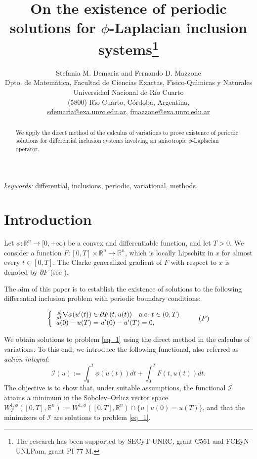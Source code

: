 \documentclass[twoside]{article}
\title{On the existence of periodic solutions for $\phi$-Laplacian inclusion systems\thanks{   The research has been supported by SECyT-UNRC, grant C561 and FCEyN-UNLPam, grant PI 77 M.
}}
\author{
Stefania M. Demaria and  Fernando D. Mazzone \\
Dpto. de Matem\'atica, Facultad de Ciencias Exactas, F\'{\i}sico-Qu\'{\i}micas y Naturales\\
Universidad Nacional de R\'{i}o Cuarto\\
(5800) R\'{\i}o Cuarto, C\'ordoba, Argentina,\\
\url{sdemaria@exa.unrc.edu.ar},
\url{fmazzone@exa.unrc.edu.ar} \\
}
\date{}
\theoremstyle{definition}
\theoremstyle{plain}
\theoremstyle{remark}
\begin{document}
\maketitle
\begin{abstract}
We apply the direct method of the calculus of variations to prove existence of periodic solutions for differential inclusion systems involving an anisotropic $\phi$-Laplacian operator.
 \end{abstract}

 \noindent\textit{keywords:} differential, inclusions, periodic, variational, methods.

\section{Introduction}

Let $\phi:\mathbb{R}^n \to [0,+\infty)$ be a convex and differentiable function, and let $T > 0$. We consider a function $F : [0,T] \times \mathbb{R}^n \to \mathbb{R}^n$, which is locally Lipschitz in $x$ for almost every $t \in [0,T]$. The Clarke generalized gradient of $F$ with respect to $x$ is denoted by $\partial F$ (see \cite{clarke1990optimization, clarke2013functional}).
 
 



The aim of this paper is to establish the existence of solutions to the following differential inclusion problem with periodic boundary conditions:

\begin{equation}\label{eq_1}\left\{
\begin{array}{ll}
   \frac{d}{dt} \nabla\phi(u'(t))\in \partial F(t,u(t)) \quad \hbox{a.e.}\ t \in (0,T)\\
    u(0)-u(T)=u'(0)-u'(T)=0,
\end{array}\right.\tag{$P$}
\end{equation}

We obtain solutions to problem \eqref{eq_1} using the direct method in the calculus of variations. To this end, we introduce the following functional, also referred as \emph{action integral}:
\begin{equation}\label{funcional}
    \mathcal{I}(u):=\int_{0}^{T}\phi(\dot u(t))dt+\int_{0}^{T}F(t, u(t))dt.\tag{I}
\end{equation}
The objective is to show that, under suitable assumptions, the functional $\mathcal{I}$ attains a minimum in the Sobolev–Orlicz vector space $W^{1,\phi}_T([0,T], \mathbb{R}^n):=W^{1,\phi}([0,T], \mathbb{R}^n)\cap \{u \mid u(0)=u(T)\}$, and that the minimizers of $\mathcal{I}$ are solutions to problem \eqref{eq_1}.
\end{document}
